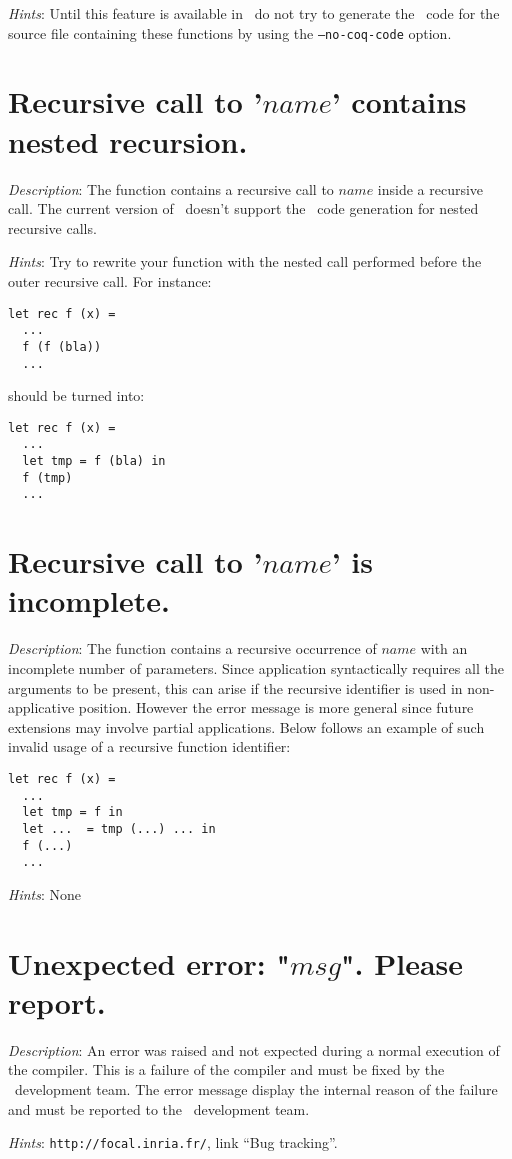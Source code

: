 {\em Hints}: Until this feature is available in \focal\, do not try to
generate the \coq\ code for the source file containing these functions
by using the {\tt --no-coq-code} option.


\section*{Recursive call to '$name$' contains nested recursion.}

{\em Description}: The function contains a recursive call to $name$
inside a recursive call. The current version of \focal\ doesn't
support the \coq\ code generation for nested recursive calls.

{\em Hints}: Try to rewrite your function with the nested call
performed before the outer recursive call. For instance:
{\scriptsize
\begin{lstlisting}
let rec f (x) =
  ...
  f (f (bla))
  ...
\end{lstlisting}
}
should be turned into:
{\scriptsize
\begin{lstlisting}
let rec f (x) =
  ...
  let tmp = f (bla) in
  f (tmp)
  ...
\end{lstlisting}
}



\section*{Recursive call to '$name$' is incomplete.}

{\em Description}: The function contains a recursive occurrence of
$name$ with an incomplete number of parameters. Since application
syntactically requires all the arguments to be present, this can arise
if the recursive identifier is used in non-applicative
position. However the error message is more general since future
extensions may involve partial applications. Below follows an example
of such invalid usage of a recursive function identifier:
{\scriptsize
\begin{lstlisting}
let rec f (x) =
  ...
  let tmp = f in
  let ...  = tmp (...) ... in
  f (...)
  ...
\end{lstlisting}
}

{\em Hints}: None



\section*{Unexpected error: "$msg$". Please report.}

{\em Description}: An error was raised and not expected during a
normal execution of the compiler. This is a failure of the compiler
and must be fixed by the \focal\ development team. The error message
display the internal reason of the failure and must be reported to the
\focal\ development team.

{\em Hints}: \verb+http://focal.inria.fr/+, link ``Bug tracking''.
